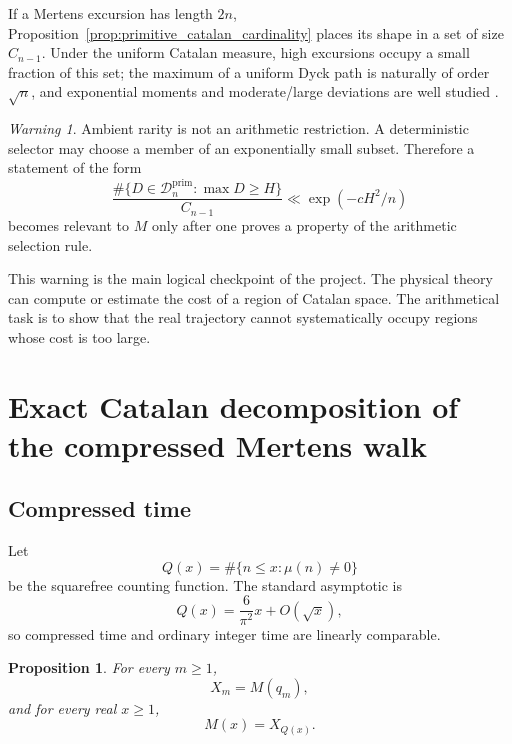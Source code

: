 \documentclass[11pt]{amsart}
\numberwithin{equation}{section}
\theoremstyle{plain}
\newtheorem{proposition}[theorem]{Proposition}
\theoremstyle{definition}
\theoremstyle{remark}
\newtheorem{warning}[theorem]{Warning}
\newcommand{\Mob}{\mu}
\newcommand{\Mert}{M}
\newcommand{\Qsf}{Q}
\newcommand{\Cat}{C}
\newcommand{\D}{\mathcal{D}}
\begin{document}
If a Mertens excursion has length $2n$, Proposition~\ref{prop:primitive_catalan_cardinality} places its shape in a set of size $\Cat_{n-1}$.  Under the uniform Catalan measure, high excursions occupy a small fraction of this set; the maximum of a uniform Dyck path is naturally of order $\sqrt n$, and exponential moments and moderate/large deviations are well studied \cite{KhorunzhiyMarckert2009,Kousha2012}.

\begin{warning}
\label{warn:rarity_not_selection}
Ambient rarity is not an arithmetic restriction.  A deterministic selector may choose a member of an exponentially small subset.  Therefore a statement of the form
\begin{equation}
\frac{\#\{D\in\D_n^{\mathrm{prim}}:\max D\ge H\}}
{\Cat_{n-1}}
\ll \exp\!\left(-cH^2/n\right)
\label{eq:ambient_rarity_only}
\end{equation}
becomes relevant to $\Mert$ only after one proves a property of the arithmetic selection rule.
\end{warning}

This warning is the main logical checkpoint of the project.  The physical theory can compute or estimate the cost of a region of Catalan space.  The arithmetical task is to show that the real trajectory cannot systematically occupy regions whose cost is too large.

\section{Exact Catalan decomposition of the compressed Mertens walk}
\label{sec:exact_catalan_decomposition}

\subsection{Compressed time}
\label{subsec:compressed_time}

Let
\begin{equation}
\Qsf(x)=\#\{n\le x:\Mob(n)\ne0\}
\label{eq:squarefree_count}
\end{equation}
be the squarefree counting function.  The standard asymptotic is
\begin{equation}
\Qsf(x)=\frac{6}{\pi^2}x+O(\sqrt{x}),
\label{eq:squarefree_density}
\end{equation}
so compressed time and ordinary integer time are linearly comparable.

\begin{proposition}
\label{prop:compression_identity}
For every $m\ge1$,
\begin{equation}
X_m=\Mert(q_m),
\label{eq:compression_identity}
\end{equation}
and for every real $x\ge1$,
\begin{equation}
\Mert(x)=X_{\Qsf(x)}.
\label{eq:decompression_identity}
\end{equation}
\end{proposition}
\end{document}
